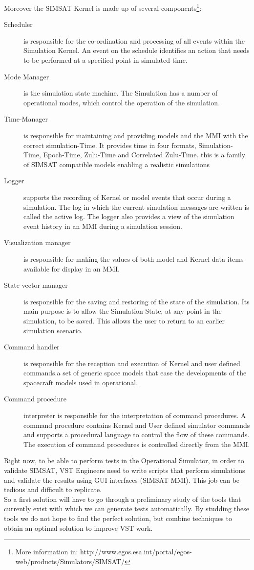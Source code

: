 Moreover the SIMSAT Kernel is made up of several components\footnote{More information in: http://www.egos.esa.int/portal/egos-web/products/Simulators/SIMSAT/}:
\begin{description}
\item[Scheduler] is responsible for the co-ordination and processing of all events within the Simulation Kernel. An event on the schedule identifies an action that needs to be performed at a specified point in simulated time.
\item[Mode Manager] is the simulation state machine. The Simulation has a number of operational modes, which control the operation of the simulation.
\item[Time-Manager] is responsible for maintaining and providing models and the MMI with the correct simulation-Time. It provides time in four formats, Simulation-Time, Epoch-Time, Zulu-Time and Correlated Zulu-Time. this is a family of SIMSAT compatible models enabling a realistic simulations
\item[Logger] supports the recording of Kernel or model events that occur during a simulation. The log in which the current simulation messages are written is called the active log. The logger also provides a view of the simulation event history in an MMI during a simulation session.
\item[Visualization manager] is responsible for making the values of both model and Kernel data items available for display in an MMI.
\item[State-vector manager] is responsible for the saving and restoring of the state of the simulation. Its main purpose is to allow the Simulation State, at any point in the simulation, to be saved. This allows the user to return to an earlier simulation scenario.
\item[Command handler] is responsible for the reception and execution of Kernel and user defined commands.a set of generic space models that ease the developments of the spacecraft models used in operational.
\item[Command procedure] interpreter is responsible for the interpretation of command procedures. A command procedure contains Kernel and User defined simulator commands and supports a procedural language to control the flow of these commands. The execution of command procedures is controlled directly from the MMI.
\end{description}

Right now, to be able to perform tests in the Operational Simulator, in order to validate SIMSAT, VST Engineers need to write scripts that
perform simulations and validate the results using GUI interfaces (SIMSAT MMI). This job can be tedious and difficult to replicate.\\
So a first solution will have to go through a preliminary study of the tools
that currently exist with which we can generate tests automatically.
By studding these tools we do not hope to find the perfect solution, but combine techniques to obtain an optimal solution to improve VST work.
